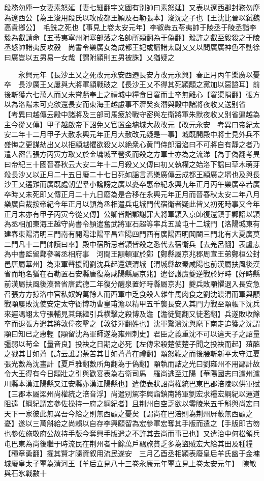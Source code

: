段務勿塵一女妻素怒延【妻七細翻宇文國有别帥曰素怒延】又表以遼西郡封務勿塵為遼西公【為王浚用段氏以攻成都王頴及石勒張本】浚沈之子也【王沈比晉以弑魏高貴鄉公】　毛銑之死也【事見上卷太安元年】李叡犇五苓夷帥于陵丞于陵丞詣李毅為叡請命【五苓夷寧州附塞部落之名帥所類翻為于偽翻】毅許之叡至毅殺之于陵丞怒帥諸夷反攻毅　尚書令樂廣女為成都王妃或譖諸太尉乂乂以問廣廣神色不動徐曰廣豈以五男易一女哉【謂附頴則五男被誅】乂猶疑之

　　永興元年【長沙王乂之死改元永安西遷長安方改元永興】春正月丙午樂廣以憂卒　長沙厲王乂屢與大將軍頴戰破之【長沙王乂不得其死頴顒之黨加以惡謚耳】前後斬獲六七萬人而乂未嘗虧奉上之禮城中糧食日窘而士卒無離心【窘渠隕翻】張方以為洛陽未可克欲還長安而東海王越慮事不濟癸亥潛與殿中諸將夜收乂送别省　【考異曰越傳云殿中諸將及三部司馬疲於戰守密與左衛將軍朱默夜收乂别省逼越為主今從乂傳】甲子越啟帝下詔免乂官置金墉城大赦改元【改元永安　考異曰帝紀太安二年十二月甲子大赦永興元年正月大赦改元疑是一事】城既開殿中將士見外兵不盛悔之更謀劫出乂以拒頴越懼欲殺乂以絶衆心黄門侍郎潘淊曰不可將自有靜之者乃遣人密告張方丙寅方取乂於金墉城至營炙而殺之方軍士亦為之流涕【為于偽翻考異曰帝紀三十國晉春秋云大安二年十二月殺乂乂傳曰初乂執權之始洛下謡曰草木萌芽殺長沙乂以正月二十五日廢二十七日死如謡言焉樂廣傳云成都王頴廣之壻也及與長沙王乂遘難而廣既處朝望羣小讒謗之廣以憂卒惠帝紀永興九年正月丙午樂廣卒若廣卒時乂未死即乂傳正月二十九日廢為是合移在永興元年正月而晉春秋太安二年八月樂廣自裁按帝紀今年正月以頴為丞相遣兵屯城門代宿衛者疑此皆乂初死時事又今年正月末亦有甲子丙寅今從乂傳】公卿皆詣鄴謝罪大將軍頴入京師復還鎮于鄴詔以頴為丞相加東海王越守尚書令頴遣奮武將軍石超等率兵五萬屯十二城門【洛陽城東有建春東陽清明三門南有開陽津陽平昌宣陽四門西有廣陽西明閶闔三門北有大夏廣莫二門凡十二門帥讀曰率】殿中宿所忌者頴皆殺之悉代去宿衛兵【去羌呂翻】表盧志為中書監留鄴參署丞相府事　河間王顒頓軍於鄭【鄭縣屬京兆郡周宣王弟鄭桓公封邑唐屬華州】為東軍聲援聞劉沈兵起還鎮渭城【渭城縣故秦咸陽也前漢屬扶風後漢省而地名猶在石勒置石安縣唐復為咸陽縣屬京兆】遣督護虞夔逆戰於好畤【好畤縣前漢屬扶風後漢晉省唐武德二年復分醴泉置好畤縣屬京兆】夔兵敗顒懼退入長安急召張方方掠洛中官私奴婢萬餘人而西軍中乏食殺人雜牛馬肉食之劉沈渡渭而軍與顒戰顒屢敗沈使安定太守衙博功曹皇甫澹以精甲五千襲長安入其門力戰至顒帳下沈兵來遲馮翊太守張輔見其無繼引兵横擊之殺博及澹【澹徒覽翻又徒濫翻】兵遂敗收餘卒而退張方遣其將敦偉夜擊之【敦徒渾翻姓也】沈軍驚潰沈與麾下南走追獲之沈謂顒曰知已之惠輕【顒留沈為軍師遂為雍州刺史】君臣之義重沈不可以違天子之詔量彊弱以苟全【量音良】投袂之日期之必死【左傳宋殺楚使楚子聞之投袂而起】葅醢之戮其甘如薺【詩云誰謂荼苦其甘如薺薺在禮翻】顒怒鞭之而後腰斬新平太守江夏張光數為沈畫計【夏戶雅翻數所角翻為于偽翻】顒執而詰之光曰劉雍州不用鄙計故令大王得有今日顒壯之引與歡宴表為右衛司馬　羅尚逃至江陽【華陽國志曰瀘州瀘川縣本漢江陽縣又江安縣亦漢江陽縣也】遣使表狀詔尚權統巴東巴郡涪陵以供軍賦【三郡本屬梁州尚權統之涪音浮】尚遣别駕李興詣鎮南將軍劉宏求糧宏綱紀以運道阻遠【綱紀謂宏參佐操持一府之綱紀者】且荆州自空乏欲以零陵米五千斛與尚宏曰天下一家彼此無異吾今給之則無西顧之憂矣【謂尚在巴涪則為荆州屛蔽無西顧之憂】遂以三萬斛給之尚賴以自存李興願留為宏參軍宏奪其手版而遣之【手版即古笏也參佐施敬府公故持手版今奪興手版遣之不許其去尚而事已也】又遣治中何松領兵屯巴東為尚後繼于時流民在荆州者十餘萬戶羈旅貧乏多為盜賊宏大給其田及種糧【種章勇翻】擢其賢才隨資叙用流民遂安　三月乙酉丞相頴表廢皇后羊氏幽于金墉城廢皇太子覃為清河王【羊后立見八十三卷永康元年覃立見上卷太安元年】　陳敏與石氷戰數十